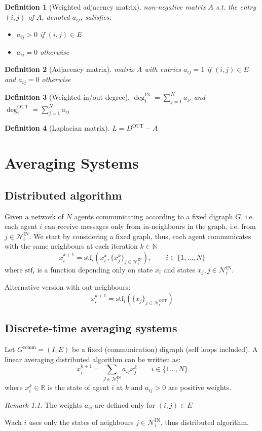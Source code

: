 \documentclass{book}
\newcommand{\R}{\mathbb{R}}
\newcommand{\N}{\mathbb{N}}
\theoremstyle{theoremv2}
\theoremstyle{defv2}
\newtheorem{definition}{Definition}[chapter]
\theoremstyle{remark}
\newtheorem*{remark}{Remark}
\theoremstyle{remark}
\theoremstyle{definition}
\theoremstyle{definition}
\begin{document}
\begin{definition}[Weighted adjacency matrix]
    non-negative matrix $A$ s.t. the entry $(i,j)$ of $A$, denoted $a_{ij}$, satisfies:
    \begin{itemize}
        \item $a_{ij} > 0$ if $(i,j)\in E$
        \item $a_{ij} = 0$ otherwise
    \end{itemize}
\end{definition}
\begin{definition}[Adjacency matrix]
    matrix $A$ with entries $a_{ij}=1$ if $(i,j)\in E$ and $a_{ij}=0$ otherwise
\end{definition}
\begin{definition}[Weighted in/out degree]
    $\deg_i^\text{IN} = \displaystyle\sum_{j=1}^{N} a_{ji}$ and $\deg_i^\text{OUT} = \displaystyle\sum_{j=1}^{N} a_{ij}$
\end{definition}
\begin{definition}[Laplacian matrix]
    $L = D^\text{OUT} - A$
\end{definition}

\chapter{Averaging Systems}
\section{Distributed algorithm}
Given a network of $N$ agents communicating according to a fixed digraph $G$, i.e. each agent $i$ can receive messages only from in-neighbours in the graph, i.e. from $j\in\mathcal{N}_i^{\text{IN}}$. 
We start by considering a fixed graph, thus, each agent communicates with the same neighbours at each iteration $k\in\N$
\[
    x_i^{k+1}=\text{stf}_i(x_i^k,\{x_j^k\}_{j\in\mathcal{N}_i^{\text{IN}}}), \qquad i\in\{1,\dots,N\}
\]
where $\text{stf}_i$ is a function depending only on state $x_i$ and states $x_j,j\in\mathcal{N}_i^{\text{IN}}$.

Alternative version with out-neighbours:
\[
    x_i^{k+1}=\text{stf}_i(\{x_j\}_{j\in\mathcal{N}_i^{\text{OUT}}})
\]
\section{Discrete-time averaging systems}
Let $G^{\text{comm}}=(I,E)$ be a fixed (communication) digraph (self loops included). A linear averaging distributed algorithm can be written as:
\[
    x_i^{k+1}=\displaystyle\sum_{J\in\mathcal{N}_i^{\text{IN}}}a_{ij}x_j^k \qquad i\in\{1\dots,N\}
\]
where $x_i^k\in\R$ is the state of agent $i$ at $k$ and $a_{ij}>0$ are positive weights. 
\begin{remark}
    The weights $a_{ij}$ are defined only for $(i,j)\in E$
\end{remark}
Wach $i$ uses only the states of neighbours $j\in\mathcal{N}_i^{\text{IN}}$, thus distributed algorithm.
\end{document}
